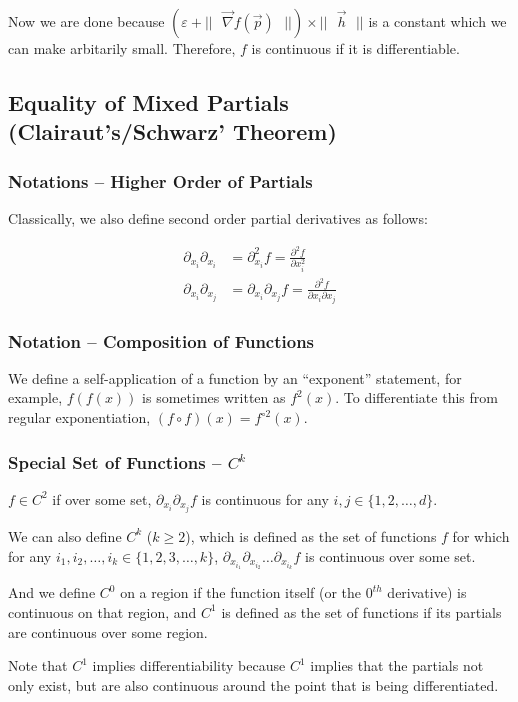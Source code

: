 \documentclass [12 pt, twoside] {book}
\newcommand\+{\text{ }}
\newcommand{\gradient}{\vec{\nabla}}
\begin{document}
Now we are done because $(\varepsilon + ||\+\gradient f(\vec{p})\+||) \times
||\+\vec{h}\+||$ is a constant which we can make arbitarily small. Therefore,
$f$ is continuous if it is differentiable.

\subsection{Equality of Mixed Partials (Clairaut's/Schwarz' Theorem)}
\subsubsection{Notations -- Higher Order of Partials}
Classically, we also define second order partial derivatives as follows:

\begin{align*}
    \partial_{x_i} \partial_{x_i} &= \partial_{x_i}^2 f = \frac{\partial^2 f}
    {\partial x_i^2}\\
    \partial_{x_i} \partial_{x_j} &= \partial_{x_i} \partial_{x_j} f =
    \frac{\partial^2 f}{\partial x_i \partial x_j}
\end{align*}

\subsubsection{Notation -- Composition of Functions}
We define a self-application of a function by an ``exponent'' statement, for
example, $f(f(x))$ is sometimes written as $f^2(x)$. To differentiate this from
regular exponentiation, $(f \circ f)(x) = f^{\circ 2}(x)$.

\subsubsection{Special Set of Functions -- $C^k$}
$f \in C^2$ if over some set, $\partial_{x_i}\partial_{x_j} f$ is continuous for any $i, j \in
\{1, 2, \dots, d\}$.

We can also define $C^k$ ($k \geq 2$), which is defined as the set of
functions $f$ for which for any $i_1, i_2, \dots, i_k \in \{1,2,3,\dots,k\}$,
$\partial_{x_{i_1}}\partial_{x_{i_2}}\dots\partial_{x_{i_k}}f$ is continuous
over some set.

And we define $C^0$ on a region if the function itself (or the $0^{th}$
derivative) is continuous on that region, and $C^1$ is defined as the set of
functions if its partials are continuous over some region.

Note that $C^1$ implies differentiability because $C^1$ implies that the
partials not only exist, but are also continuous around the point that is being
differentiated.
\end{document}
